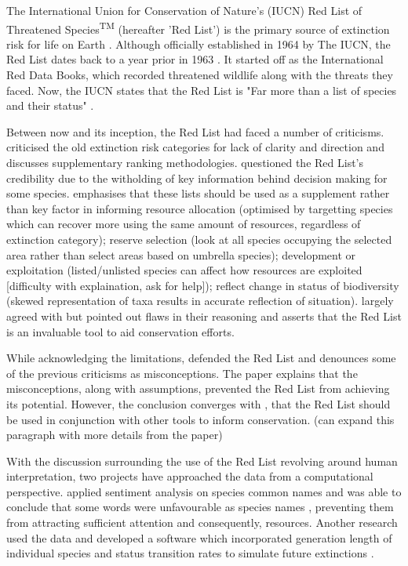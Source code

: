 The International Union for Conservation of Nature's (IUCN) Red List of Threatened Species\textsuperscript{TM} (hereafter 'Red List') is the primary source of extinction risk for life on Earth \parencite{iucn2021, rodrigues2006value, lamoreux2003value}. Although officially established in 1964 by The IUCN, the Red List dates back to a year prior in 1963 \parencite{scott1987red}. It started off as the International Red Data Books, which recorded threatened wildlife along with the threats they faced. Now, the IUCN states that the Red List is "Far more than a list of species and their status" \parencite{iucn2021}. 

Between now and its inception, the Red List had faced a number of criticisms. \textcite{master1991assessing} criticised the old extinction risk categories for lack of clarity and direction and discusses supplementary ranking methodologies. \textcite{mrosovsky1997iucn} questioned the Red List's credibility due to the witholding of key information behind decision making for some species. \textcite{possingham2002limits} emphasises that these lists should be used as a supplement rather than key factor in informing resource allocation (optimised by targetting species which can recover more using the same amount of resources, regardless of extinction category); reserve selection (look at all species occupying the selected area rather than select areas based on umbrella species); development or exploitation (listed/unlisted species can affect how resources are exploited [difficulty with explaination, ask for help]); reflect change in status of biodiversity (skewed representation of taxa results in accurate reflection of situation). \textcite{lamoreux2003value} largely agreed with \textcite*{possingham2002limits} but pointed out flaws in their reasoning and asserts that the Red List is an invaluable tool to aid conservation efforts. 

While acknowledging the limitations, \textcite{rodrigues2006value} defended the Red List and denounces some of the previous criticisms as misconceptions. The paper explains that the misconceptions, along with assumptions, prevented the Red List from achieving its potential. However, the conclusion converges with \textcite{possingham2002limits}, that the Red List should be used in conjunction with other tools to inform conservation. (can expand this paragraph with more details from the paper)

With the discussion surrounding the use of the Red List revolving around human interpretation, two projects have approached the data from a computational perspective. \textcite{gregg2020many} applied sentiment analysis on species common names and was able to conclude that some words were unfavourable as species names \parencite{gregg2020many}, preventing them from attracting sufficient attention and consequently, resources. Another research used the data and developed a software which incorporated generation length of individual species and status transition rates to simulate future extinctions \parencite{andermann2021iucn_sim}.

